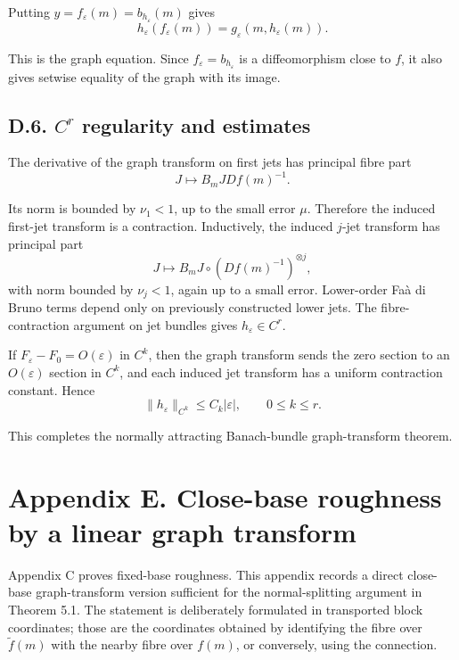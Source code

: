 \documentclass[12pt,a4paper]{article}
\theoremstyle{plain}
\numberwithin{equation}{section}
\numberwithin{theorem}{section}
\begin{document}
Putting $y=f_\varepsilon(m)=b_{h_\varepsilon}(m)$ gives
\[
h_\varepsilon(f_\varepsilon(m))
=
g_\varepsilon(m,h_\varepsilon(m)).
\]

This is the graph equation. Since $f_\varepsilon=b_{h_\varepsilon}$ is a diffeomorphism close to $f$, it also gives setwise equality of the graph with its image.

\subsection{D.6. $C^r$ regularity and estimates}

The derivative of the graph transform on first jets has principal fibre part
\[
J\mapsto B_mJ Df(m)^{-1}.
\]

Its norm is bounded by $\nu_1<1$, up to the small error $\mu$. Therefore the induced first-jet transform is a contraction. Inductively, the induced $j$-jet transform has principal part
\[
J\mapsto B_mJ\circ(Df(m)^{-1})^{\otimes j},
\]
with norm bounded by $\nu_j<1$, again up to a small error. Lower-order Faà di Bruno terms depend only on previously constructed lower jets. The fibre-contraction argument on jet bundles gives $h_\varepsilon\in C^r$.

If $F_\varepsilon-F_0=O(\varepsilon)$ in $C^k$, then the graph transform sends the zero section to an $O(\varepsilon)$ section in $C^k$, and each induced jet transform has a uniform contraction constant. Hence
\[
\|h_\varepsilon\|_{C^k}
\le C_k|\varepsilon|,
\qquad
0\le k\le r.
\]

This completes the normally attracting Banach-bundle graph-transform theorem.

\clearpage

\section{Appendix E. Close-base roughness by a linear graph transform}

Appendix C proves fixed-base roughness. This appendix records a direct close-base graph-transform version sufficient for the normal-splitting argument in Theorem 5.1. The statement is deliberately formulated in transported block coordinates; those are the coordinates obtained by identifying the fibre over $\widetilde f(m)$ with the nearby fibre over $f(m)$, or conversely, using the connection.
\end{document}
